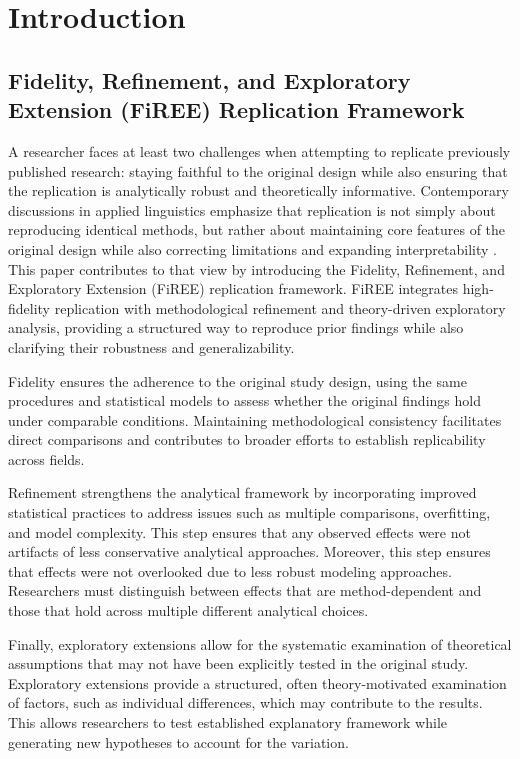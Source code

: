 \section{Introduction}
\subsection{Fidelity, Refinement, and Exploratory Extension (FiREE) Replication Framework}

A researcher faces at least two challenges when attempting to replicate previously published research: staying faithful to the original design while also ensuring that the replication is analytically robust and theoretically informative. Contemporary discussions in applied linguistics emphasize that replication is not simply about reproducing identical methods, but rather about maintaining core features of the original design while also correcting limitations and expanding interpretability \parencite{marsden2018,mcmanus2024,porte2018}. This paper contributes to that view by introducing the Fidelity, Refinement, and Exploratory Extension (FiREE) replication framework. FiREE integrates high-fidelity replication with methodological refinement and theory-driven exploratory analysis, providing a structured way to reproduce prior findings while also clarifying their robustness and generalizability.

Fidelity ensures the adherence to the original study design, using the same procedures and statistical models to assess whether the original findings hold under comparable conditions. Maintaining methodological consistency facilitates direct comparisons and contributes to broader efforts to establish replicability across fields. 

Refinement strengthens the analytical framework by incorporating improved statistical practices to address issues such as multiple comparisons, overfitting, and model complexity. This step ensures that any observed effects were not artifacts of less conservative analytical approaches. Moreover, this step ensures that effects were not overlooked due to less robust modeling approaches. Researchers must distinguish between effects that are method-dependent and those that hold across multiple different analytical choices.

Finally, exploratory extensions allow for the systematic examination of theoretical assumptions that may not have been explicitly tested in the original study. Exploratory extensions provide a structured, often theory-motivated examination of factors, such as individual differences, which may contribute to the results. This allows researchers to test established explanatory framework while generating new hypotheses to account for the variation. 

